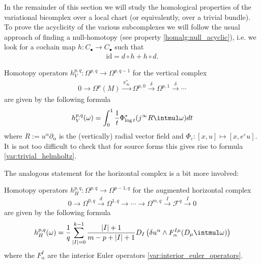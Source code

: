     In the remainder of this section we will study the homological properties of the variational bicomplex over a local chart (or equivalently, over a trivial bundle). To prove the acyclicity of the various subcomplexes we will follow the usual approach of finding a null-homotopy (see property \ref{homalg:null_acyclic}), i.e. we look for a cochain map $h:C_\bullet\rightarrow C_\bullet$ such that
    \begin{gather}
        \text{id} = d\circ h + h\circ d.
    \end{gather}

    \begin{property}
        Homotopy operators $h^{p,q}_V:\Omega^{p,q}\rightarrow\Omega^{p,q-1}$ for the vertical complex
        \begin{gather}
            0\longrightarrow\Omega^p(M)\xrightarrow{\,\pi_\infty^*\,}\Omega^{p,0}\xrightarrow{\ \delta\ }\Omega^{p,1}\xrightarrow{\ \delta\ }\cdots
        \end{gather}
        are given by the following formula
        \begin{gather}
            h^{p,q}_V(\omega) = \int_0^1\frac{1}{t}\Phi^*_{\log t}(j^\infty R\intmul\omega)dt
        \end{gather}
        where $R:=u^\alpha\partial_\alpha$ is the (vertically) radial vector field and $\Phi_\varepsilon:[x,u]\mapsto[x,e^\varepsilon u]$. It is not too difficult to check that for source forms this gives rise to formula \ref{var:trivial_helmholtz}.
    \end{property}
    The analogous statement for the horizontal complex is a bit more involved:
    \begin{property}
        Homotopy operators $h^{p,q}_H:\Omega^{p,q}\rightarrow\Omega^{p-1,q}$ for the augmented horizontal complex
        \begin{gather}
            0\longrightarrow\Omega^{0,q}\xrightarrow{\ d\ }\Omega^{1,q}\longrightarrow\cdots\longrightarrow\Omega^{m,q}\xrightarrow{\ I\ }\mathcal{F}^q\xrightarrow{\ I\ }0
        \end{gather}
        are given by the following formula
        \begin{gather}
            h^{p,q}_H(\omega) = \frac{1}{q}\sum_{|I|=0}^{k-1}\frac{|I|+1}{m-p+|I|+1}D_I\left(\delta u^\alpha\wedge F^{I\mu}_\alpha(D_\mu\intmul\omega)\right)
        \end{gather}
        where the $F^I_\alpha$ are the interior Euler operators \ref{var:interior_euler_operators}.
    \end{property}

